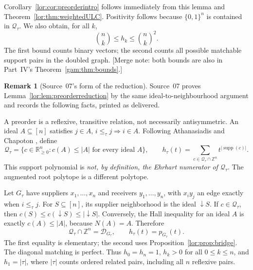 \documentclass[11pt]{article}
\numberwithin{equation}{section}
\theoremstyle{definition}
\newtheorem{remark}[theorem]{Remark}
\newcommand{\R}{\mathbb R}
\newcommand{\Z}{\mathbb Z}
\newcommand{\Qt}{\mathcal Q_\tau}
\newcommand{\supp}{\operatorname{supp}}
\newcommand{\cD}{\mathcal D}
\begin{document}
Corollary~\ref{lor:cor:preorderintro} follows immediately from this lemma and
Theorem~\ref{lor:thm:weightedULC}. Positivity follows because $\{0,1\}^n$
is contained in $\Qt$. We also obtain, for all $k$,
\begin{equation}
 \binom n k\le h_k\le\binom n k^2.
 \label{lor:eq:preorderbounds}
\end{equation}
The first bound counts binary vectors; the second counts all possible
matchable support pairs in the doubled graph.
[Merge note: both bounds are also in Part~IV's Theorem~\ref{gam:thm:bounds}.]

\begin{remark}[Source~07's form of the reduction]
Source~07 proves Lemma~\ref{lor:lem:preorderreduction} by the same
ideal-to-neighbourhood argument and records the following facts, printed as
delivered.
\end{remark}
A preorder is a reflexive, transitive relation, not necessarily antisymmetric.
An ideal $A\subseteq[n]$ satisfies $j\in A$, $i\le_\tau j\Rightarrow i\in A$.
Following Athanasiadis and Chapoton \cite{AC}, define
\begin{equation}
 \Qt=\{c\in\R_{\ge0}^n:c(A)\le |A|\text{ for every ideal }A\},
 \qquad
 h_\tau(t)=\sum_{c\in \Qt\cap\Z^n}t^{|\supp(c)|}.
 \label{lor:sp:eq:preorder}
\end{equation}
This support polynomial is \emph{not, by definition, the Ehrhart numerator of
$\Qt$}. The augmented root polytope is a different polytope.

Let $G_\tau$ have suppliers $x_1,\ldots,x_n$ and receivers
$y_1,\ldots,y_n$, with $x_i y_j$ an edge exactly when $i\le_\tau j$.
For $S\subseteq[n]$, its supplier neighborhood is the ideal $\downarrow S$.
If $c\in \Qt$, then
$c(S)\le c(\downarrow S)\le |\downarrow S|$.
Conversely, the Hall inequality for an ideal $A$ is exactly
$c(A)\le |A|$, because $N(A)=A$. Therefore
\begin{equation}
 \Qt\cap\Z^n=\cD_{G_\tau},\qquad h_\tau(t)=p_{G_\tau}(t).
 \label{lor:sp:eq:preorderbridge}
\end{equation}
The first equality is elementary; the second uses Proposition~\ref{lor:prop:bridge}.
The diagonal matching is perfect. Thus $h_0=h_n=1$, $h_k>0$ for all
$0\le k\le n$, and $h_1=|\tau|$, where $|\tau|$ counts ordered related pairs,
including all $n$ reflexive pairs.
\end{document}
